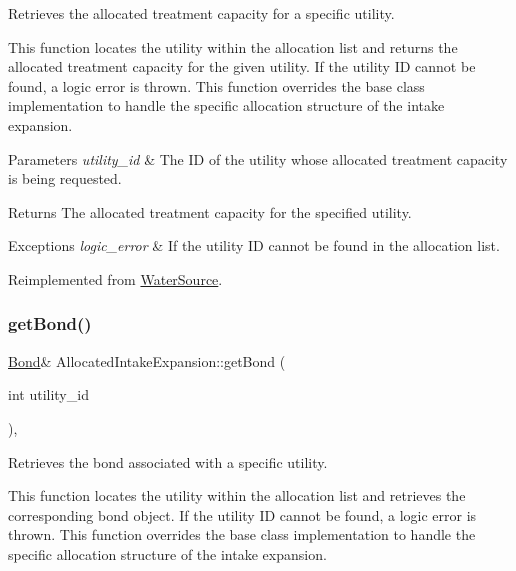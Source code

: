Retrieves the allocated treatment capacity for a specific utility. 

This function locates the utility within the allocation list and returns the allocated treatment capacity for the given utility. If the utility ID cannot be found, a logic error is thrown. This function overrides the base class implementation to handle the specific allocation structure of the intake expansion.


\begin{DoxyParams}{Parameters}
{\em utility\+\_\+id} & The ID of the utility whose allocated treatment capacity is being requested.\\
\hline
\end{DoxyParams}
\begin{DoxyReturn}{Returns}
The allocated treatment capacity for the specified utility.
\end{DoxyReturn}

\begin{DoxyExceptions}{Exceptions}
{\em logic\+\_\+error} & If the utility ID cannot be found in the allocation list. \\
\hline
\end{DoxyExceptions}


Reimplemented from \mbox{\hyperlink{classWaterSource_ab98528c4d2e6ecd14cb2c813b1d445c6}{Water\+Source}}.

\mbox{\label{classAllocatedIntakeExpansion_a3091edd0793cf2bd4e01fc178ae72ffb}} 
\subsubsection{\texorpdfstring{get\+Bond()}{getBond()}}
{\footnotesize\ttfamily \mbox{\hyperlink{classBond}{Bond}}\& Allocated\+Intake\+Expansion\+::get\+Bond (\begin{DoxyParamCaption}\item[{int}]{utility\+\_\+id }\end{DoxyParamCaption})\hspace{0.3cm}{\ttfamily [override]}, {\ttfamily [virtual]}}



Retrieves the bond associated with a specific utility. 

This function locates the utility within the allocation list and retrieves the corresponding bond object. If the utility ID cannot be found, a logic error is thrown. This function overrides the base class implementation to handle the specific allocation structure of the intake expansion.


